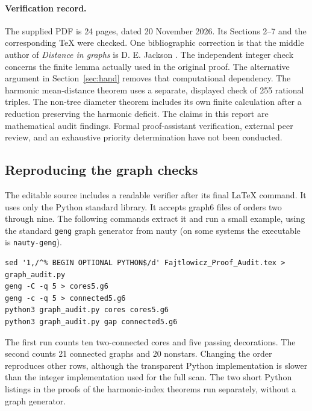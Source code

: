\documentclass[11pt,a4paper]{article}
\theoremstyle{remark}\newtheorem*{remark}{Remark}
\begin{document}
\paragraph{Verification record.}
The supplied PDF is 24 pages, dated 20 November 2026. Its Sections 2--7 and the corresponding TeX were checked. One bibliographic correction is that the middle author of \emph{Distance in graphs} is D. E. Jackson \cite{ejs}. The independent integer check concerns the finite lemma actually used in the original proof. The alternative argument in Section~\ref{sec:hand} removes that computational dependency. The harmonic mean-distance theorem uses a separate, displayed check of 255 rational triples. The non-tree diameter theorem includes its own finite calculation after a reduction preserving the harmonic deficit. The claims in this report are mathematical audit findings. Formal proof-assistant verification, external peer review, and an exhaustive priority determination have not been conducted.

\subsection*{Reproducing the graph checks}
The editable source includes a readable verifier after its final LaTeX command. It uses only the Python standard library. It accepts graph6 files of orders two through nine. The following commands extract it and run a small example, using the standard \texttt{geng} graph generator from nauty (on some systems the executable is \texttt{nauty-geng}).
\begin{lstlisting}
sed '1,/^% BEGIN OPTIONAL PYTHON$/d' Fajtlowicz_Proof_Audit.tex > graph_audit.py
geng -C -q 5 > cores5.g6
geng -c -q 5 > connected5.g6
python3 graph_audit.py cores cores5.g6
python3 graph_audit.py gap connected5.g6
\end{lstlisting}
The first run counts ten two-connected cores and five passing decorations. The second counts 21 connected graphs and 20 nonstars. Changing the order reproduces other rows, although the transparent Python implementation is slower than the integer implementation used for the full scan. The two short Python listings in the proofs of the harmonic-index theorems run separately, without a graph generator.
\end{document}
